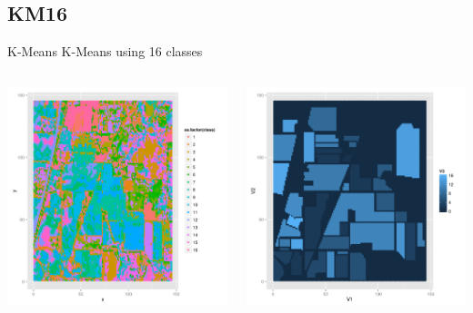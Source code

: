 \documentclass[11pt]{beamer}
\begin{document}
\subsection{KM16}
\begin{frame}{K-Means}
K-Means using 16 classes
\begin{columns}[T]
\begin{column}{.48\textwidth}
\includegraphics[scale=.3]{km16.png}
\end{column}
\hfill
\begin{column}{.48\textwidth}
\includegraphics[scale=.3]{gt.png}
\end{column}
\end{columns}
\end{frame}
\end{document}
